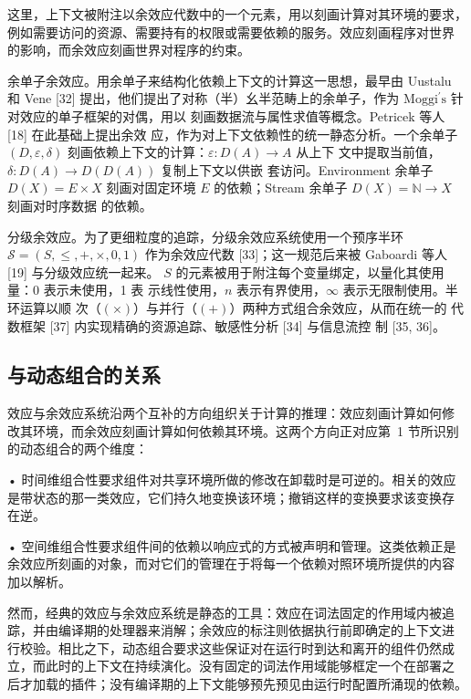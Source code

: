 \documentclass[
  10
]{article}
\begin{document}
这里，上下文被附注以余效应代数中的一个元素，用以刻画计算对其环境的要求，
例如需要访问的资源、需要持有的权限或需要依赖的服务。效应刻画程序对世界
的影响，而余效应刻画世界对程序的约束。

余单子余效应。用余单子来结构化依赖上下文的计算这一思想，最早由 Uustalu
和 Vene {[}32{]} 提出，他们提出了对称（半）幺半范畴上的余单子，作为
\(\mathrm { M o g g i ^ { \prime } s }\) 针对效应的单子框架的对偶，用以
刻画数据流与属性求值等概念。Petricek 等人 {[}18{]} 在此基础上提出余效
应，作为对上下文依赖性的统一静态分析。一个余单子 \(( D , \varepsilon ,
\delta )\) 刻画依赖上下文的计算：\(\varepsilon : D ( A ) \to A\) 从上下
文中提取当前值，\(\delta : D ( A ) \to D ( D ( A ) )\) 复制上下文以供嵌
套访问。Environment 余单子 \(D ( X ) = E \times X\) 刻画对固定环境 \(E\)
的依赖；Stream 余单子 \(D ( X ) = \mathbb { N } \to X\) 刻画对时序数据
的依赖。

分级余效应。为了更细粒度的追踪，分级余效应系统使用一个预序半环
\(\mathcal{S} = ( S , \leq , + , \times , 0 , 1 )\) 作为余效应代数
{[}33{]}；这一规范后来被 Gaboardi 等人 {[}19{]} 与分级效应统一起来。
\(S\) 的元素被用于附注每个变量绑定，以量化其使用量：0 表示未使用，1 表
示线性使用，\(n\) 表示有界使用，\(\infty\) 表示无限制使用。半环运算以顺
次（\(( \times )\)）与并行（\(( + )\)）两种方式组合余效应，从而在统一的
代数框架 {[}37{]} 内实现精确的资源追踪、敏感性分析 {[}34{]} 与信息流控
制 {[}35, 36{]}。

\subsection{与动态组合的关系} \label{relationship-to-dynamic-composability}

效应与余效应系统沿两个互补的方向组织关于计算的推理：效应刻画计算如何修
改其环境，而余效应刻画计算如何依赖其环境。这两个方向正对应第~1 节所识别
的动态组合的两个维度：

• 时间维组合性要求组件对共享环境所做的修改在卸载时是可逆的。相关的效应
是带状态的那一类效应，它们持久地变换该环境；撤销这样的变换要求该变换存
在逆。

• 空间维组合性要求组件间的依赖以响应式的方式被声明和管理。这类依赖正是
余效应所刻画的对象，而对它们的管理在于将每一个依赖对照环境所提供的内容
加以解析。

然而，经典的效应与余效应系统是静态的工具：效应在词法固定的作用域内被追
踪，并由编译期的处理器来消解；余效应的标注则依据执行前即确定的上下文进
行校验。相比之下，动态组合要求这些保证对在运行时到达和离开的组件仍然成
立，而此时的上下文在持续演化。没有固定的词法作用域能够框定一个在部署之
后才加载的插件；没有编译期的上下文能够预先预见由运行时配置所涌现的依赖。
\end{document}
